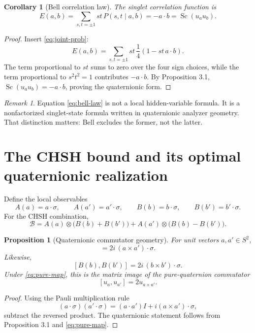 \documentclass[11pt]{article}
\newtheorem{proposition}[definition]{Proposition}
\newtheorem{corollary}[definition]{Corollary}
\theoremstyle{remark}
\newtheorem{remark}[definition]{Remark}
\newcommand{\Id}{I}
\newcommand{\Sc}{\operatorname{Sc}}
\begin{document}
\begin{corollary}[Bell correlation law]
The singlet correlation function is
\begin{equation}
E(a,b)
=
\sum_{s,t=\pm1} st\,P(s,t\mid a,b)
=
-a\cdot b
=
\Sc(u_a u_b).
\label{eq:bell-law}
\end{equation}
\end{corollary}

\begin{proof}
Insert \eqref{eq:joint-prob}:
\[
E(a,b)
=
\sum_{s,t=\pm1} st\,\frac14(1-st\,a\cdot b).
\]
The term proportional to $st$ sums to zero over the four sign choices, while the term proportional to $s^2 t^2 = 1$ contributes $-a\cdot b$. By Proposition 3.1, $\Sc(u_a u_b)=-a\cdot b$, proving the quaternionic form.
\end{proof}

\begin{remark}
Equation \eqref{eq:bell-law} is not a local hidden-variable formula. It is a nonfactorized singlet-state formula written in quaternionic analyzer geometry. That distinction matters: Bell excludes the former, not the latter.
\end{remark}

\section{The CHSH bound and its optimal quaternionic realization}

Define the local observables
\[
A(a)=a\cdot \sigma,
\qquad
A(a')=a'\cdot \sigma,
\qquad
B(b)=b\cdot \sigma,
\qquad
B(b')=b'\cdot \sigma.
\]
For the CHSH combination,
\begin{equation}
\mathcal{B}
=
A(a)\otimes\bigl(B(b)+B(b')\bigr)
+
A(a')\otimes\bigl(B(b)-B(b')\bigr).
\label{eq:chsh-operator}
\end{equation}

\begin{proposition}[Quaternionic commutator geometry]
For unit vectors $a,a'\in S^2$,
\begin{equation}
[A(a),A(a')] = 2i\,(a\times a')\cdot \sigma.
\label{eq:comm-a}
\end{equation}
Likewise,
\[
[B(b),B(b')] = 2i\,(b\times b')\cdot \sigma.
\]
Under \eqref{eq:pure-map}, this is the matrix image of the pure-quaternion commutator
\[
[u_a,u_{a'}] = 2u_{a\times a'}.
\]
\end{proposition}

\begin{proof}
Using the Pauli multiplication rule
\[
(a\cdot \sigma)(a'\cdot \sigma)
=
(a\cdot a')\Id + i(a\times a')\cdot \sigma,
\]
subtract the reversed product. The quaternionic statement follows from Proposition 3.1 and \eqref{eq:pure-map}.
\end{proof}
\end{document}
